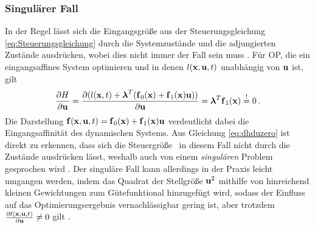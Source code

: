 \subsubsection{Singulärer Fall}\label{subsubsec:Singularität}
In der Regel lässt sich die Eingangsgröße aus der Steuerungsgleichung \eqref{eq:Steuerungsgleichung} durch die Systemzustände und die adjungierten Zustände ausdrücken, wobei dies nicht immer der Fall sein muss \cite{KnutGraichen.2012}. Für \gls{OP}, die ein eingangsaffines System optimieren und in denen $l(\boldsymbol{\mathrm{x}},\boldsymbol{\mathrm{u}},t)$ unabhängig von $\boldsymbol{\mathrm{u}}$ ist, gilt 
\begin{equation}
	\frac{\partial H}{\partial \boldsymbol{\mathrm{u}}} = \frac{\partial (l(\boldsymbol{\mathrm{x}},t) + \boldsymbol{\mathrm{\lambda}}^T(\boldsymbol{\mathrm{f}}_0(\boldsymbol{\mathrm{x}})+\boldsymbol{\mathrm{f}}_1(\boldsymbol{\mathrm{x}})\boldsymbol{\mathrm{u}}))}{\partial \boldsymbol{\mathrm{u}}} = \boldsymbol{\mathrm{\lambda}}^T\boldsymbol{\mathrm{f}}_1(\boldsymbol{\mathrm{x}}) \stackrel{!}{=} 0 \,. \label{eq:dhduzero}
\end{equation}
Die Darstellung $\boldsymbol{\mathrm{f}}(\boldsymbol{\mathrm{x}},\boldsymbol{\mathrm{u}},t) = \boldsymbol{\mathrm{f}}_0(\boldsymbol{\mathrm{x}})+\boldsymbol{\mathrm{f}}_1(\boldsymbol{\mathrm{x}})\boldsymbol{\mathrm{u}}$ verdeutlicht dabei die Eingangsaffinität des dynamischen Systems. Aus Gleichung \eqref{eq:dhduzero} ist direkt zu erkennen, dass sich die Steuergröße \uoft~in diesem Fall nicht durch die Zustände ausdrücken lässt, weshalb auch von einem \textit{singulären} Problem gesprochen wird \cite{KnutGraichen.2012}. Der singuläre Fall kann allerdings in der Praxis leicht umgangen werden, indem das Quadrat der Stellgröße $\boldsymbol{\mathrm{u}}^2$ mithilfe von hinreichend kleinen Gewichtungen zum Gütefunktional hinzugefügt wird, sodass der Einfluss auf das Optimierungsergebnis vernachlässigbar gering ist, aber trotzdem $\frac{\partial l(\boldsymbol{\mathrm{x}},\boldsymbol{\mathrm{u}},t)}{\partial \boldsymbol{\mathrm{u}}} \neq 0$ gilt \cite{KnutGraichen.2012}.

